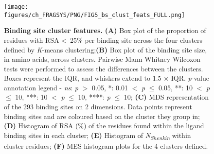 \begin{figure}[htb!]
    \centering
    \texttt{[image: figures/ch\_FRAGSYS/PNG/FIG5\_bs\_clust\_feats\_FULL.png]}
    \caption[Binding site cluster features]{\textbf{Binding site cluster features.} \textbf{(A)} Box plot of the proportion of residues with RSA \textless~25\% per binding site across the four clusters defined by \textit{K}-means clustering;\textbf{(B)} Box plot of the binding site size, in amino acids, across clusters. Pairwise Mann-Whitney-Wilcoxon tests were performed to assess the differences between the clusters. Boxes represent the IQR, and whiskers extend to 1.5 $\times$ IQR. \textit{p}-value annotation legend - \textit{ns}: \textit{p} $>$ 0.05, *: 0.01 $<$ \textit{p} $\leq$ 0.05, **: 10\textsuperscript{} $<$ \textit{p} $\leq$ 10\textsuperscript{}, ***: 10\textsuperscript{} $<$ \textit{p} $\leq$ 10\textsuperscript{}, ****: \textit{p} $\leq$ 10\textsuperscript{}; \textbf{(C)} MDS representation of the 293 binding sites on 2 dimensions. Data points represent binding sites and are coloured based on the cluster they group in; \textbf{(D)} Histogram of RSA (\%) of the residues found within the ligand binding sites in each cluster; \textbf{(E)} Histogram of \textit{N\textsubscript{Shenkin}} within cluster residues; \textbf{(F)} MES histogram plots for the 4 clusters defined.}
    \label{fig:bs_clusts_feats}
\end{figure}

